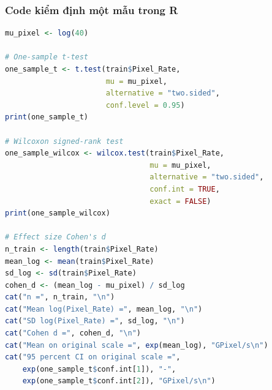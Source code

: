 \subsubsection{Code kiểm định một mẫu trong R}

\begin{lstlisting}[language=R, caption={One-sample t-test và Wilcoxon signed-rank test cho Pixel\_Rate}]
mu_pixel <- log(40)

# One-sample t-test
one_sample_t <- t.test(train$Pixel_Rate,
                       mu = mu_pixel,
                       alternative = "two.sided",
                       conf.level = 0.95)
print(one_sample_t)

# Wilcoxon signed-rank test
one_sample_wilcox <- wilcox.test(train$Pixel_Rate,
                                 mu = mu_pixel,
                                 alternative = "two.sided",
                                 conf.int = TRUE,
                                 exact = FALSE)
print(one_sample_wilcox)

# Effect size Cohen's d
n_train <- length(train$Pixel_Rate)
mean_log <- mean(train$Pixel_Rate)
sd_log <- sd(train$Pixel_Rate)
cohen_d <- (mean_log - mu_pixel) / sd_log
cat("n =", n_train, "\n")
cat("Mean log(Pixel_Rate) =", mean_log, "\n")
cat("SD log(Pixel_Rate) =", sd_log, "\n")
cat("Cohen d =", cohen_d, "\n")
cat("Mean on original scale =", exp(mean_log), "GPixel/s\n")
cat("95 percent CI on original scale =",
    exp(one_sample_t$conf.int[1]), "-",
    exp(one_sample_t$conf.int[2]), "GPixel/s\n")
\end{lstlisting}

